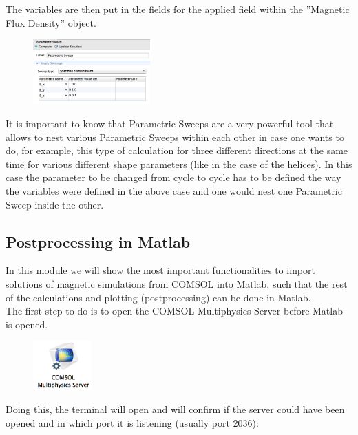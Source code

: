 The variables are then put in the fields for the applied field within the ''Magnetic Flux Density'' object.\\
\begin{figure}[H]
	\centering
  \includegraphics[width=0.4\textwidth]{Pictures/Screenshots/Sim28.png}
\end{figure} 

It is important to know that Parametric Sweeps are a very powerful tool that allows to nest various Parametric Sweeps within each other in case one wants to do, for example, this type of calculation for three different directions at the same time for various different shape parameters (like in the case of the helices). In this case the parameter to be changed from cycle to cycle has to be defined the way the variables were defined in the above case and one would nest one Parametric Sweep inside the other.

\subsection{Postprocessing in Matlab}

In this module we will show the most important functionalities to import solutions of magnetic simulations from COMSOL into Matlab, such that the rest of the calculations and plotting (postprocessing) can be done in Matlab.\\

The first step to do is to open the COMSOL Multiphysics Server before Matlab is opened.\\

\begin{figure}[H]
	\centering
  \includegraphics[width=0.2\textwidth]{Pictures/Screenshots/Sim30.png}
\end{figure} 

Doing this, the terminal will open and will confirm if the server could have been opened and in which port it is listening (usually port 2036):

